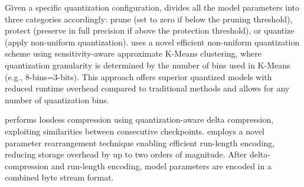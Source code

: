 \noindent{\textbf{\quantizer} (\S~\ref{sec:quantization}):} 
Given a specific quantization configuration, \sys divides all the model parameters into three categories accordingly: 
prune (set to zero if below the pruning threshold), protect (preserve in full precision if above the protection threshold), or quantize (apply non-uniform quantization).
\sys uses a novel efficient non-uniform quantization scheme using sensitivity-aware approximate K-Means clustering, where quantization granularity is determined by the number of bins used in K-Means (e.g., 8-bins=3-bits). This approach offers superior quantized models with reduced runtime overhead compared to traditional methods and allows for any number of quantization bins.

\noindent{\textbf{\deltaE} (\S~\ref{sec:delta}):} 
\sys performs lossless compression using quantization-aware delta compression, exploiting similarities between consecutive checkpoints. \deltaE employs a novel parameter rearrangement technique enabling efficient run-length encoding, reducing storage overhead by up to two orders of magnitude.
After delta-compression and run-length encoding, model parameters are encoded in a combined byte stream format.
